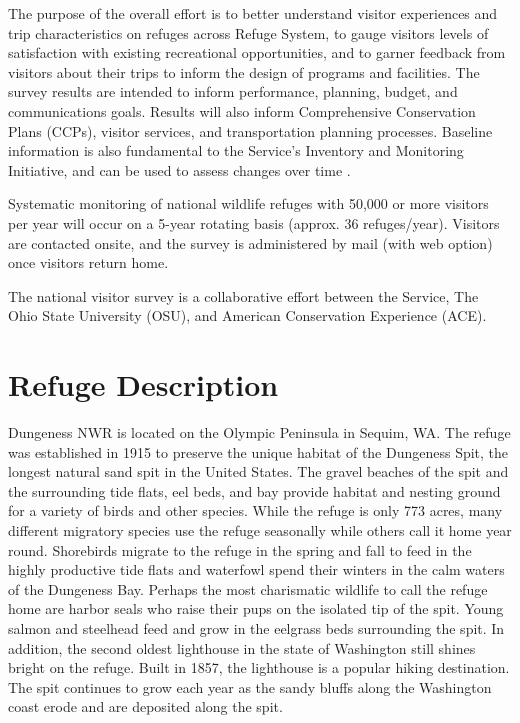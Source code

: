 \documentclass[]{book}
\begin{document}
The purpose of the overall effort is to better understand visitor
experiences and trip characteristics on refuges across Refuge System, to
gauge visitors levels of satisfaction with existing recreational
opportunities, and to garner feedback from visitors about their trips to
inform the design of programs and facilities. The survey results are
intended to inform performance, planning, budget, and communications
goals. Results will also inform Comprehensive Conservation Plans (CCPs),
visitor services, and transportation planning processes. Baseline
information is also fundamental to the Service's Inventory and
Monitoring Initiative, and can be used to assess changes over time
\citep{USFWS2017}.

Systematic monitoring of national wildlife refuges with 50,000 or more
visitors per year will occur on a 5-year rotating basis (approx. 36
refuges/year). Visitors are contacted onsite, and the survey is
administered by mail (with web option) once visitors return home.

The national visitor survey is a collaborative effort between the
Service, The Ohio State University (OSU), and American Conservation
Experience (ACE).

\chapter{Refuge Description}\label{refuge-description}

Dungeness NWR is located on the Olympic Peninsula in Sequim, WA. The
refuge was established in 1915 to preserve the unique habitat of the
Dungeness Spit, the longest natural sand spit in the United States. The
gravel beaches of the spit and the surrounding tide flats, eel beds, and
bay provide habitat and nesting ground for a variety of birds and other
species. While the refuge is only 773 acres, many different migratory
species use the refuge seasonally while others call it home year round.
Shorebirds migrate to the refuge in the spring and fall to feed in the
highly productive tide flats and waterfowl spend their winters in the
calm waters of the Dungeness Bay. Perhaps the most charismatic wildlife
to call the refuge home are harbor seals who raise their pups on the
isolated tip of the spit. Young salmon and steelhead feed and grow in
the eelgrass beds surrounding the spit. In addition, the second oldest
lighthouse in the state of Washington still shines bright on the refuge.
Built in 1857, the lighthouse is a popular hiking destination. The spit
continues to grow each year as the sandy bluffs along the Washington
coast erode and are deposited along the spit.
\end{document}
